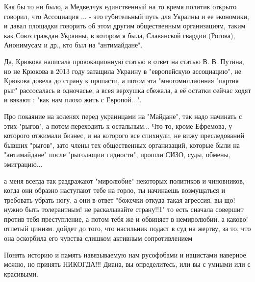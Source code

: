\begin{itemize}
\begin{itemize}
Как бы то ни было, а Медведчук единственный на то время политик открыто
говорил, что Ассоциация ... - это губительный путь для Украины и ее экономики,
и давал площадки говорить об этом другим общественным организациям, таким как
Союз граждан Украины, в котором я была, Славянской гвардии (Рогова), Анонимусам
и др., кто был на "антимайдане". 

Да, Крюкова написала провокационную статью в ответ на статью В. В. Путина, но
не Крюкова в 2013 году затащила Украину в "европейскую ассоциацию", не Крюкова
довела до страну к пропасти, а потом эта "многомиллионная "партия рыг"
рассосалась в одночасье, а всея верхушка сбежала, а её остатки сейчас ходят и
вякают : "как нам плохо жить с Европой...". 

Про покаяние на коленях перед украинцами на "Майдане", так надо начинать с этих
"рыгов", а потом переходить к остальным... Что-то, кроме Ефремова, у которого
отжимали бизнес, и на которого все спихнули, не вижу преследований бывших
"рыгов", зато члены тех общественных организаций, которые были на "антимайдане"
после "рыголюции гидности", прошли СИЗО, суды, обмены, эмиграцию...

\end{itemize}

 

а меня всегда так раздражают "миролюбие" некоторых политиков и чиновников,
когда они образно наступают тебе на горло, ты начинаешь возмущаться и требовать
убрать ногу, а они в ответ "божечки откуда такая агрессия, вы що! нужно быть
толерантным! не раскалывайте страну!!1" то есть сначала совершит против тебя
преступление, а потом тебя же и обвиняет в немиролюбии. а каково! отпетый
цинизм. дойдет до того, что насильник подаст в суд на жертву, за то, что она
оскорбила его чувства слишком активным сопротивлением


 

Понять историю и память навязываемую нам русофобами и нацистами наверное можно,
но принять НИКОГДА!!! Диана, вы определитесь, или вы с умными или с красивыми.



\end{itemize}
